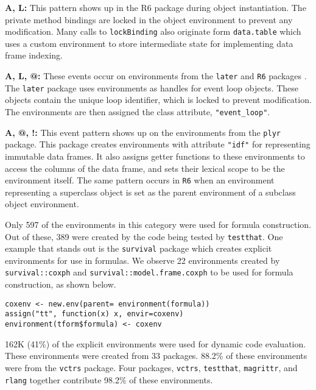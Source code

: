 \documentclass[10pt,review,sigplan,anonymous=true,authorversion=true,nonacm=true]{acmart}
\newcommand{\code}[1]{\lstinline |#1|\xspace}
\begin{document}
\noindent
\textbf{A, L:} This pattern shows up in the R6 package during object
instantiation. The private method bindings are locked in the object environment
to prevent any modification. Many calls to \code{lockBinding} also originate
form \code{data.table} which uses a custom environment to store intermediate
state for implementing data frame indexing.

\noindent
\textbf{A, L, @:} These events occur on environments from the \code{later} and
\code{R6} packages . The \code{later} package uses environments as handles for
event loop objects. These objects contain the unique loop identifier, which is
locked to prevent modification. The environments are then assigned the class
attribute, \code{"event_loop"}.

\noindent
\textbf{A, @, !:} This event pattern shows up on the environments from the
\code{plyr} package. This package creates environments with attribute
\code{"idf"} for representing immutable data frames. It also assigns getter
functions to these environments to access the columns of the data frame, and
sets their lexical scope to be the environment itself. The same pattern occurs
in \code{R6} when an environment representing a superclass object is set as the
parent environment of a subclass object environment.

Only 597 of the environments in this category were used for formula
construction. Out of these, 389 were created by the code being tested by
\code{testthat}. One example that stands out is the \code{survival} package
which creates explicit environments for use in formulas. We observe 22
environments created by \code{survival::coxph} and
\code{survival::model.frame.coxph} to be used for formula construction, as shown
below.

\begin{lstlisting}
coxenv <- new.env(parent= environment(formula))
assign("tt", function(x) x, envir=coxenv)
environment(tform$formula) <- coxenv
\end{lstlisting}

162K (41\%) of the explicit environments were used for dynamic code evaluation.
These environments were created from 33 packages. 88.2\% of these environments
were from the \code{vctrs} package. Four packages, \code{vctrs},
\code{testthat}, \code{magrittr}, and \code{rlang} together contribute 98.2\% of
these environments.
\end{document}
